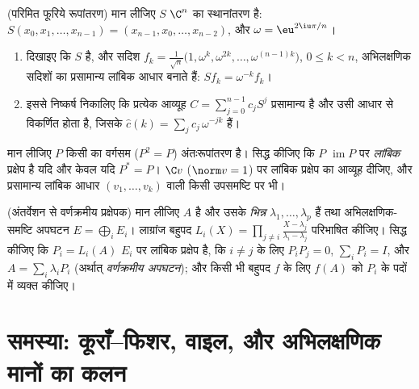 \begin{exercise}[$\star\star$]\label{exo:b2:hermitian:10}
(परिमित फूरिये रूपांतरण) मान लीजिए $S$ $\C^n$ का  स्थानांतरण है: $S(x_0, x_1, \dots, x_{n-1}) = (x_{n-1}, x_0, \dots,
x_{n-2})$,
और $\omega = \eu^{2\iu\pi/n}$।
\begin{enumerate}
  \item दिखाइए कि $S$  है, और सदिश $f_k =
        \frac{1}{\sqrt n}\bigl(1, \omega^k, \omega^{2k}, \dots,
        \omega^{(n-1)k}\bigr)$, $0 \leq k < n$, अभिलक्षणिक सदिशों का
        प्रसामान्य लांबिक आधार बनाते हैं: $Sf_k = \omega^{-k}
        f_k$।
  \item इससे निष्कर्ष निकालिए कि प्रत्येक \emph{} आव्यूह $C =
        \sum_{j=0}^{n-1} c_jS^j$
        प्रसामान्य है और उसी आधार से विकर्णित होता है, जिसके  $\widehat c(k) = \sum_j
        c_j\,\omega^{-jk}$ हैं।
\end{enumerate}
\end{exercise}

\begin{exercise}[$\star\star$]\label{exo:b2:hermitian:11}
मान लीजिए $P$ किसी  का वर्गसम ($P^2 = P$) अंतःरूपांतरण है।
सिद्ध कीजिए कि $P$ $\operatorname{im} P$ पर \emph{लांबिक} प्रक्षेप है यदि और केवल यदि $P^* = P$।
$\C v$ ($\norm v = 1$) पर लांबिक प्रक्षेप का आव्यूह दीजिए, और प्रसामान्य लांबिक आधार
$(v_1, \dots, v_k)$ वाली किसी उपसमष्टि पर भी।
\end{exercise}

\begin{exercise}[$\star\star\star$]\label{exo:b2:hermitian:12}
(अंतर्वेशन से वर्णक्रमीय प्रक्षेपक) मान लीजिए $A$  है और उसके
\emph{भिन्न}  $\lambda_1, \dots, \lambda_p$ हैं तथा अभिलक्षणिक-समष्टि अपघटन $E = \bigoplus_i E_i$।
लाग्रांज बहुपद $L_i(X) = \prod_{j\neq i}\frac{X -
\lambda_j}{\lambda_i - \lambda_j}$ परिभाषित कीजिए। सिद्ध कीजिए कि $P_i = L_i(A)$ $E_i$ पर लांबिक
प्रक्षेप है, कि $i \neq j$ के लिए $P_iP_j = 0$, $\sum_i P_i = I$, और $A = \sum_i \lambda_iP_i$ (अर्थात् \emph{वर्णक्रमीय
अपघटन}); और किसी भी बहुपद $f$ के लिए $f(A)$ को $P_i$ के पदों में व्यक्त
कीजिए।
\end{exercise}

\section{समस्या: कूराँ--फिशर, वाइल, और अभिलक्षणिक मानों का कलन}


